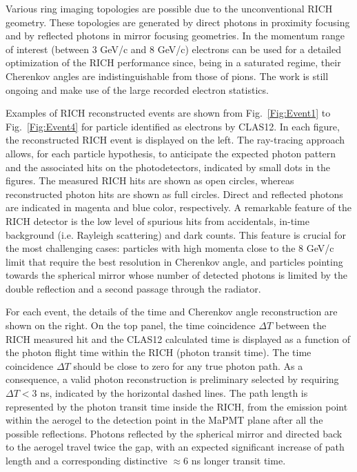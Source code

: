 \documentclass[5p,times,twocolumn]{elsarticle}
\def\MaPMT{MaPMT }
\begin{document}
Various ring imaging topologies are possible due to the  unconventional RICH geometry. These topologies are generated by direct photons in proximity focusing and by reflected photons in mirror focusing geometries. In the momentum range of interest (between 3 GeV/c and 8 GeV/c) electrons can be used for a detailed optimization of the RICH performance since, being in a saturated regime, their Cherenkov angles are indistinguishable from those of pions. The work is still ongoing and make use of the large recorded electron statistics.

Examples of RICH reconstructed events are shown from Fig.~\ref{Fig:Event1} to Fig.~\ref{Fig:Event4} for particle identified as electrons by CLAS12. In each figure, the reconstructed RICH event is displayed on the left. The ray-tracing approach allows, for each particle hypothesis, to anticipate the expected photon pattern and the associated hits on the photodetectors, indicated by small dots in the figures.
The measured RICH hits are shown as open circles, whereas reconstructed photon hits are shown as full circles. Direct and reflected photons are indicated in magenta and blue color, respectively. A remarkable feature of the RICH detector is the low level of spurious hits from accidentals, in-time background (i.e. Rayleigh scattering) and dark counts. This feature is crucial for the most challenging cases: particles with high momenta close to the 8 GeV/c limit that require the best resolution in Cherenkov angle, and particles pointing towards the spherical mirror whose number of detected photons is limited by the double reflection and a second passage through the radiator. 

For each event, the details of the time and Cherenkov angle reconstruction are shown on the right. On the top panel, the time coincidence $\Delta T$ between the RICH measured hit and the CLAS12 calculated time is displayed as a function of the photon flight time within the RICH (photon transit time). The time coincidence $\Delta T$ should be close to zero for any true photon path. As a consequence, a valid photon reconstruction is preliminary selected by requiring $\Delta T<3$ ns, indicated by the horizontal dashed lines. The path length is represented by the photon transit time inside the RICH, from the emission point within the aerogel to the detection point in the \MaPMT plane after all the possible reflections. Photons reflected by the spherical mirror and directed back to the aerogel travel twice the gap, with an expected significant increase of path length and a corresponding distinctive $\approx 6$ ns longer transit time. %
\end{document}
